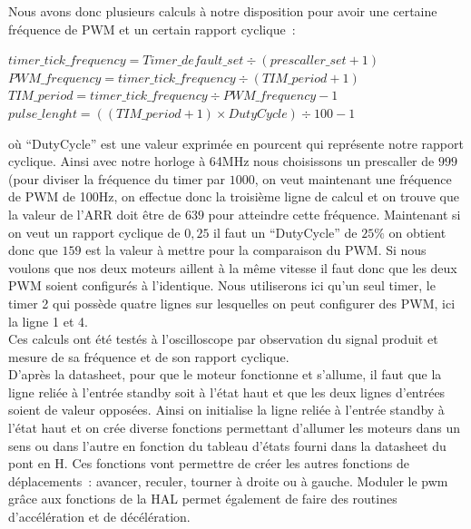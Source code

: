 \documentclass{article}
\begin{document}
Nous avons donc plusieurs calculs à notre disposition pour avoir une certaine fréquence de PWM et un certain rapport cyclique~: \\

\begin{center}
  $timer\_tick\_frequency = Timer\_default\_set \div ( prescaller\_set + 1 )$ \\
  $PWM\_frequency = timer\_tick\_frequency \div ( TIM\_period + 1 ) $ \\
  $TIM\_period = timer\_tick\_frequency \div PWM\_frequency - 1 $ \\
  $pulse\_lenght = ((TIM\_period + 1) \times DutyCycle) \div 100 - 1$ \\
\end{center} 

où ``DutyCycle'' est une valeur exprimée en pourcent qui représente notre rapport cyclique. Ainsi avec notre horloge à 64MHz nous choisissons un prescaller de $999$ (pour diviser la fréquence du timer par $1000$, on veut maintenant une fréquence de PWM de 100Hz, on effectue donc la troisième ligne de calcul et on trouve que la valeur de l'ARR doit être de $639$ pour atteindre cette fréquence. Maintenant si on veut un rapport cyclique de $0,25$ il faut un ``DutyCycle'' de $25\%$ on obtient donc que $159$ est la valeur à mettre pour la comparaison du PWM. Si nous voulons que nos deux moteurs aillent à la même vitesse il faut donc que les deux PWM soient configurés à l'identique. Nous utiliserons ici qu'un seul timer, le timer 2 qui possède quatre lignes sur lesquelles on peut configurer des PWM, ici la ligne 1 et 4. \\

Ces calculs ont été testés à l’oscilloscope par observation du signal produit et mesure de sa fréquence et de son rapport cyclique. \\

D'après la datasheet, pour que le moteur fonctionne et s'allume, il faut que la ligne reliée à l'entrée standby soit à l'état haut et que les deux lignes d'entrées soient de valeur opposées. Ainsi on initialise la ligne reliée à l'entrée standby à l'état haut et on crée diverse fonctions permettant d'allumer les moteurs dans un sens ou dans l'autre en fonction du tableau d'états fourni dans la datasheet du pont en H. Ces fonctions vont permettre de créer les autres fonctions de déplacements~: avancer, reculer, tourner à droite ou à gauche. Moduler le pwm grâce aux fonctions de la HAL permet également de faire des routines d'accélération et de décélération.
\end{document}
